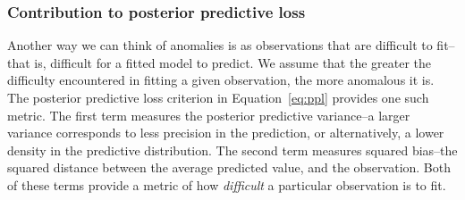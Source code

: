 \subsubsection{Contribution to posterior predictive loss}
Another way we can think of anomalies is as observations that are difficult to fit--that is, difficult
    for a fitted model to predict.  We assume that the greater the difficulty encountered in fitting a
    given observation, the more anomalous it is.  The posterior predictive loss criterion in
    Equation~\ref{eq:ppl} provides one such metric.  The first term measures the posterior predictive
    variance--a larger variance corresponds to less precision in the prediction, or alternatively, a lower
    density in the predictive distribution.  The second term measures squared bias--the squared distance
    between the average predicted value, and the observation.  Both of these terms provide a metric of
    how \emph{difficult} a particular observation is to fit.




